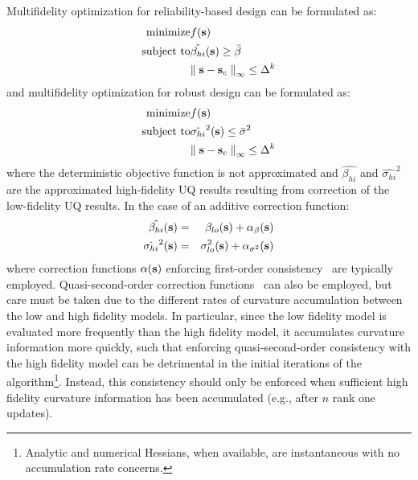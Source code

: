 Multifidelity optimization for reliability-based design can be
formulated as:
\begin{eqnarray}
  {\rm minimize }     & f({\bf s}) \nonumber \\
  {\rm subject \ to } & \hat{\beta_{hi}}({\bf s}) \ge \bar{\beta} \\
& {\parallel {\bf s} - {\bf s}_c \parallel}_\infty \le \Delta^k \nonumber
\label{eq:rbdo_mf}
\end{eqnarray}
and multifidelity optimization for robust design can be formulated as:
\begin{eqnarray}
  {\rm minimize }     & f({\bf s}) \nonumber \\
  {\rm subject \ to } & \hat{\sigma_{hi}}^2({\bf s}) \le \bar{\sigma}^2 \\
& {\parallel {\bf s} - {\bf s}_c \parallel}_\infty \le \Delta^k \nonumber
\label{eq:rdo_mf}
\end{eqnarray}
where the deterministic objective function is not approximated and 
$\hat{\beta_{hi}}$ and $\hat{\sigma_{hi}}^2$ are the approximated
high-fidelity UQ results resulting from correction of the low-fidelity 
UQ results.  In the case of an additive correction function:
\begin{eqnarray}
\hat{\beta_{hi}}({\bf s})    &=& \beta_{lo}({\bf s}) + 
\alpha_{\beta}({\bf s})  \label{eq:corr_lf_beta} \\
\hat{\sigma_{hi}}^2({\bf s}) &=& \sigma_{lo}^2({\bf s}) + 
\alpha_{\sigma^2}({\bf s}) \label{eq:corr_lf_sigma}
\end{eqnarray}
where correction functions $\alpha({\bf s})$ enforcing first-order
consistency~\cite{Eld04} are typically employed.  Quasi-second-order
correction functions~\cite{Eld04} can also be employed, but care
must be taken due to the different rates of curvature accumulation
between the low and high fidelity models.  In particular, since the
low fidelity model is evaluated more frequently than the high fidelity
model, it accumulates curvature information more quickly, such that
enforcing quasi-second-order consistency with the high fidelity model
can be detrimental in the initial iterations of the
algorithm\footnote{Analytic and numerical Hessians, when
available, are instantaneous with no accumulation rate concerns.}.
Instead, this consistency should only be enforced when sufficient high
fidelity curvature information has been accumulated (e.g., after $n$
rank one updates).
